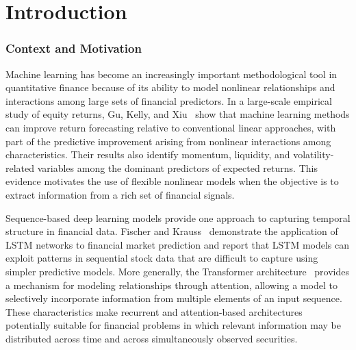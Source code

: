 \setcounter{page}{1}
\fancyfoot{} %

\part{Introduction} \label{part:introduction}

\section{Context and Motivation} \label{sec:context-and-motivation}
Machine learning has become an increasingly important methodological tool in quantitative finance because of its ability to model nonlinear relationships and interactions among large sets of financial predictors. In a large-scale empirical study of equity returns, Gu, Kelly, and Xiu~\cite{Gu2020} show that machine learning methods can improve return forecasting relative to conventional linear approaches, with part of the predictive improvement arising from nonlinear interactions among characteristics. Their results also identify momentum, liquidity, and volatility-related variables among the dominant predictors of expected returns. This evidence motivates the use of flexible nonlinear models when the objective is to extract information from a rich set of financial signals.

\medskip

Sequence-based deep learning models provide one approach to capturing temporal structure in financial data. Fischer and Krauss~\cite{FischerKrauss2018} demonstrate the application of \acf{LSTM} networks to financial market prediction and report that \acs{LSTM} models can exploit patterns in sequential stock data that are difficult to capture using simpler predictive models. More generally, the Transformer architecture~\cite{Vaswani2017} provides a mechanism for modeling relationships through attention, allowing a model to selectively incorporate information from multiple elements of an input sequence. These characteristics make recurrent and attention-based architectures potentially suitable for financial problems in which relevant information may be distributed across time and across simultaneously observed securities.

\medskip

